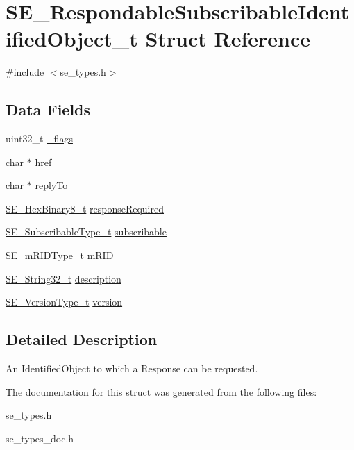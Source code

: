 \hypertarget{structSE__RespondableSubscribableIdentifiedObject__t}{}\section{S\+E\+\_\+\+Respondable\+Subscribable\+Identified\+Object\+\_\+t Struct Reference}
\label{structSE__RespondableSubscribableIdentifiedObject__t}


{\ttfamily \#include $<$se\+\_\+types.\+h$>$}

\subsection*{Data Fields}
\begin{DoxyCompactItemize}
\item 
uint32\+\_\+t \hyperlink{group__RespondableSubscribableIdentifiedObject_gaa666043fd30e537b01f874c21f4e1137}{\+\_\+flags}
\item 
char $\ast$ \hyperlink{group__RespondableSubscribableIdentifiedObject_gab4bad1872ec7dff1ca79b125133dfe54}{href}
\item 
char $\ast$ \hyperlink{group__RespondableSubscribableIdentifiedObject_gad863d865c9bb67c7f7d9d3e77040d1ad}{reply\+To}
\item 
\hyperlink{group__HexBinary8_gaecf2dab3615fb954a693c017a61f77d6}{S\+E\+\_\+\+Hex\+Binary8\+\_\+t} \hyperlink{group__RespondableSubscribableIdentifiedObject_gae273cf33926a7ae6aea4c750008fb884}{response\+Required}
\item 
\hyperlink{group__SubscribableType_ga5c41f553d369710ed34619266bf2551e}{S\+E\+\_\+\+Subscribable\+Type\+\_\+t} \hyperlink{group__RespondableSubscribableIdentifiedObject_ga5c1d53f218cacfd624c053684090d4a8}{subscribable}
\item 
\hyperlink{group__mRIDType_gac74622112f3a388a2851b2289963ba5e}{S\+E\+\_\+m\+R\+I\+D\+Type\+\_\+t} \hyperlink{group__RespondableSubscribableIdentifiedObject_ga73dd144660105c95edc69f4a84188802}{m\+R\+ID}
\item 
\hyperlink{group__String32_gac9f59b06b168b4d2e0d45ed41699af42}{S\+E\+\_\+\+String32\+\_\+t} \hyperlink{group__RespondableSubscribableIdentifiedObject_gaef5b09933ff6bbd31bd6a1edf942d23a}{description}
\item 
\hyperlink{group__VersionType_ga4b8d27838226948397ed99f67d46e2ae}{S\+E\+\_\+\+Version\+Type\+\_\+t} \hyperlink{group__RespondableSubscribableIdentifiedObject_ga5479f5b7d65fae80406692691cdbf2f7}{version}
\end{DoxyCompactItemize}


\subsection{Detailed Description}
An Identified\+Object to which a Response can be requested. 

The documentation for this struct was generated from the following files\+:\begin{DoxyCompactItemize}
\item 
se\+\_\+types.\+h\item 
se\+\_\+types\+\_\+doc.\+h\end{DoxyCompactItemize}
